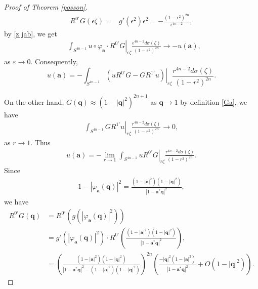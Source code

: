 \documentclass[10pt,a4paper]{amsart}
\begin{document}
\begin{proof}[Proof of Theorem \ref{posson}]
\begin{equation*}
\begin{aligned}
R^{0'}G(\epsilon\zeta)=&g'(\epsilon^2)\epsilon^2=-\frac{(1-\epsilon^2)^{2n}}{\epsilon^{4n-2}},
\end{aligned}\end{equation*}
by \eqref{z jab}, we get
\begin{equation*}\begin{aligned}
&\int_{S^{4n-1}}\left.u\circ\varphi_{\mathbf{a}}\cdot R^{0'}G\right|_{\epsilon\zeta} \frac{\epsilon^{4n-2}d\sigma(\zeta)}{(1-\epsilon^2)^{2n}}\rightarrow-u(\mathbf{a}),
\end{aligned}\end{equation*}
as $\varepsilon\rightarrow 0$. Consequently,
$$u(\mathbf{a})=-\int_{S^{4n-1}}\left.(uR^{0'}G-GR^{1'}u)\right|_{r\zeta}\frac{r^{4n-2}d\sigma(\zeta)}{(1-r^2)^{2n}}.$$

  On the other hand, $G(\mathbf{q})\approx (1-|\mathbf{q}|^2)^{2n+1}$ as $\mathbf{q}\rightarrow 1$ by definition \eqref{Ga}, we have
\begin{equation*}\begin{aligned}
\int_{S^{4n-1}}\left.GR^{1'}u\right|_{r\zeta}\frac{r^{4n-2}d\sigma(\zeta)}{(1-r^2)^{2n}}\rightarrow0,
\end{aligned}\end{equation*}
as $r\rightarrow 1$. Thus
\begin{equation}\begin{aligned}\label{ua}
u(\mathbf{a})=-\lim_{r\rightarrow 1}\int_{S^{4n-1}}\left.uR^{0'}G\right|_{r\zeta}\frac{r^{4n-2}d\sigma(\zeta)}{(1-r^2)^{2n}}.
\end{aligned}\end{equation}
Since
\begin{equation}\begin{aligned}\label{psi eq}
1-|\varphi_{\mathbf{a}}(\mathbf{q})|^2=\frac{(1-|\mathbf{a}|^2)(1-|\mathbf{q}|^2)}{|1-\mathbf{a}^*\mathbf{q}|^2},
\end{aligned}\end{equation}
we have
\begin{align*}
R^{0'} G(\mathbf{q}) &= R^{0'} \left( g\left( |\varphi_{\mathbf{a}}(\mathbf{q})|^2 \right) \right) \\
&= g'(|\varphi_{\mathbf{a}}(\mathbf{q})|^2) \cdot R^{0'}\left( \frac{(1 - |\mathbf{a}|^2)(1 - |\mathbf{q}|^2)}{|1 - \mathbf{a}^* \mathbf{q}|^2} \right),\\
&= \left( \frac{(1 - |\mathbf{a}|^2)(1 - |\mathbf{q}|^2)}{|1 - \mathbf{a}^* \mathbf{q}|^2 - (1 - |\mathbf{a}|^2)(1 - |\mathbf{q}|^2)} \right)^{2n}   \left(\frac{-|\mathbf{q}|^2 (1 - |\mathbf{a}|^2)}{|1 - \mathbf{a}^* \mathbf{q}|^2}+O(1-|\mathbf{q}|^2)\right).

\end{align*}
\end{proof}
\end{document}
